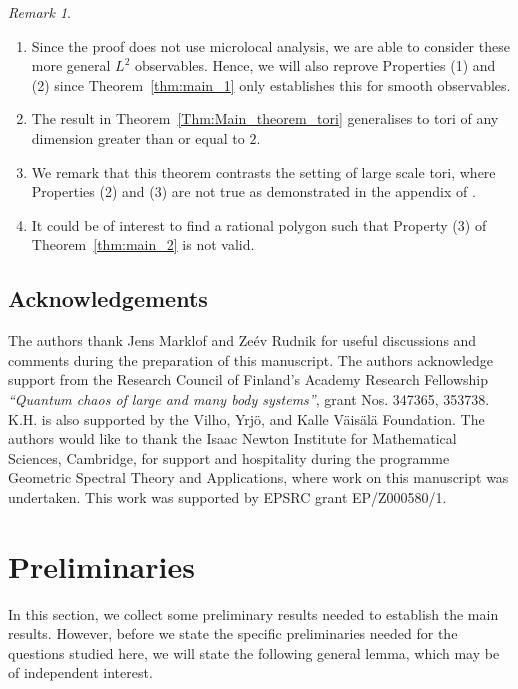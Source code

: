 \documentclass[11pt,twoside,reqno]{amsart}
\newcommand{\1}{\mathrm{\mathbf{1}}}
\numberwithin{equation}{section}
\theoremstyle{plain}
\theoremstyle{definition}
\theoremstyle{remark}
\newtheorem{remark}[thm]{Remark}
\begin{document}
\begin{remark}
$ $ \\ 
\vspace{-1em}
    \begin{enumerate}[label=\textnormal{(\roman*)}]
    \item Since the proof does not use microlocal analysis, we are able to consider these more general $L^2$ observables. Hence, we will also reprove Properties (1) and (2) since Theorem~\ref{thm:main_1} only establishes this for smooth observables.
    
    \item The result in Theorem~\ref{Thm:Main_theorem_tori} generalises to tori of any dimension greater than or equal to $2$.

    \item We remark that this theorem contrasts the setting of large scale tori, where Properties (2) and (3) are not true as demonstrated in the appendix of \cite{Hippi}.  

    \item It could be of interest to find a rational polygon such that Property (3) of Theorem~\ref{thm:main_2} is not valid.

    \end{enumerate}
\end{remark}

\subsection*{Acknowledgements} The authors thank Jens Marklof and Ze\'ev Rudnik for useful discussions and comments during the preparation of this manuscript. The authors acknowledge support from the Research Council of Finland's Academy Research Fellowship \emph{``Quantum chaos of large and many body systems''}, grant Nos. 347365, 353738. K.H. is also supported by the Vilho, Yrjö, and Kalle Väisälä Foundation. The authors would like to thank the Isaac Newton Institute for Mathematical Sciences, Cambridge, for support and hospitality during the programme Geometric Spectral Theory and Applications, where work on this manuscript was undertaken. This work was supported by EPSRC grant EP/Z000580/1.


\section{Preliminaries}
In this section, we collect some preliminary results needed to establish the main results. However, before we state the specific preliminaries needed for the questions studied here, we will state the following general lemma, which may be of independent interest.
\end{document}
